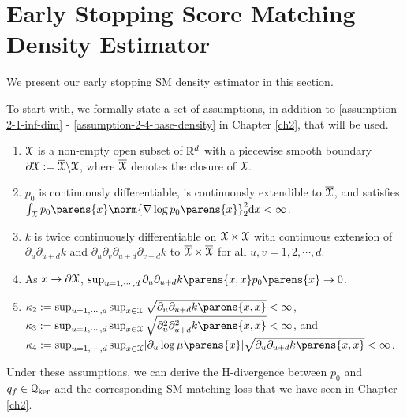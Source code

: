 \section{Early Stopping Score Matching Density Estimator}\label{section-smes-estimator}

We present our early stopping SM density estimator in this section. %

To start with, we formally state a set of assumptions, in addition to \ref{assumption-2-1-inf-dim} - \ref{assumption-2-4-base-density} in Chapter \ref{ch2}, that will be used. 

\begin{enumerate}[label=\textbf{(B\arabic*)},series=assumptions]
	\item \label{assumption-1} $\mathcal{X}$ is a non-empty open subset of $\mathbb{R}^d$ with a piecewise smooth boundary $\partial \mathcal{X} := \overline{\mathcal{X}} \backslash \mathcal{X}$, where $\overline{\mathcal{X}}$ denotes the closure of $\mathcal{X}$. 
	\item \label{assumption-2} $p_0$ is continuously differentiable, is continuously extendible to $\overline{\mathcal{X}}$, and satisfies $\int_{\calX} p_0 \parens{x} \norm{\nabla \log p_0 \parens{x}}_2^2 \diff x < \infty$. 
	\item \label{assumption-3} $k$ is twice continuously differentiable on $\mathcal{X} \times \mathcal{X}$ with continuous extension of $\partial_u \partial_{u+d} k$ and $\partial_u \partial_v \partial_{u+d} \partial_{v+d} k$ to $\overline{\mathcal{X}} \times \overline{\mathcal{X}}$ for all $u, v = 1, 2, \cdots, d$. 
	\item \label{assumption-4} As $x \to \partial \mathcal{X}$, $\sup_{u = 1, \cdots, d} \partial_u \partial_{u+d} k \parens{x, x} p_0 \parens{x} \to 0$.  
	\item \label{assumption-5} $\kappa_2 := \sup_{u = 1, \cdots, d} \sup_{x \in \calX} \sqrt{\partial_u \partial_{u+d} k \parens{x, x}} < \infty$, \\ 
		$\kappa_3 := \sup_{u = 1, \cdots, d} \sup_{x \in \calX} \sqrt{\partial_u^2 \partial_{u+d}^2 k \parens{x, x}} < \infty$, and \\ 
		$\kappa_4 := \sup_{u = 1, \cdots, d} \sup_{x \in \calX} \abs{\partial_u \log \mu \parens{x}} \sqrt{\partial_u \partial_{u+d} k \parens{x, x}}  < \infty$. 
\end{enumerate}

Under these assumptions, we can derive the H-divergence between $p_0$ and $q_f \in \mathcal{Q}_{\ker}$ and the corresponding SM matching loss that we have seen in Chapter \ref{ch2}. 

